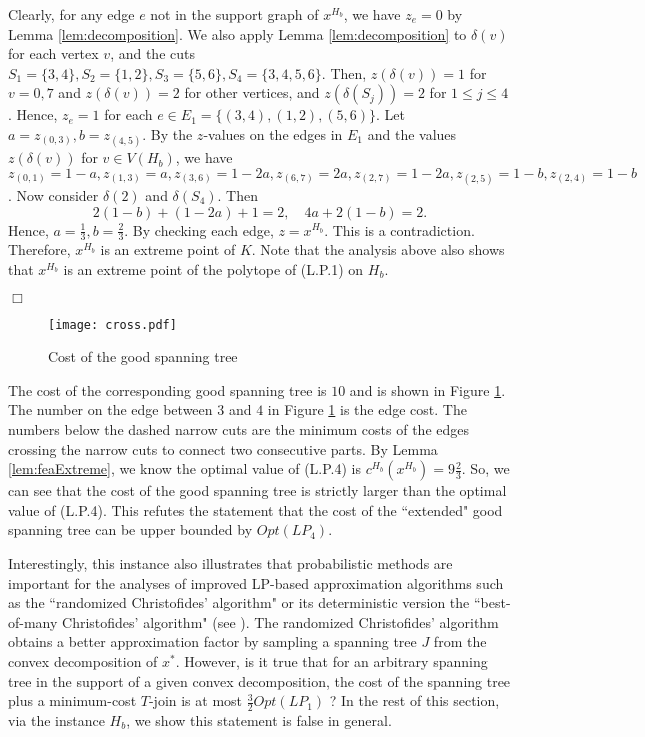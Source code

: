 \documentclass[11pt]{article}
\newcommand{\qed}{\hspace*{\fill}$\Box$}
\newenvironment{proof}[1][Proof. ]{\noindent {\bf #1 }}{\qed}
\begin{document}
\begin{proof}
Clearly, for any edge $e$ not in the support graph of $x^{H_b}$, we have $z_e=0$ by Lemma \ref{lem:decomposition}.
We also
apply Lemma \ref{lem:decomposition} to $\delta(v)$ for each vertex $v$, and the cuts $S_1=\{3, 4\}, S_2=\{1, 2\}, S_3=\{5, 6\}, S_4=\{3, 4, 5, 6\}$.
Then, $z(\delta(v))=1$ for $v=0,7$ and $z(\delta(v))=2$ for other vertices, and $z(\delta(S_j))=2$ for $1\leq j \leq  4$.
Hence, $z_e=1$ for each $e\in E_1=\{(3, 4), (1, 2), (5, 6)\}$. Let $a=z_{(0, 3)}, b=z_{(4, 5)}$. By the $z$-values on the edges in $E_1$ and the values $z(\delta(v))$ for $v\in V(H_b)$, we have $z_{(0, 1)}=1-a, z_{(1, 3)}=a,  z_{(3, 6)}=1-2a, z_{(6, 7)}=2a, z_{(2,7)}=1-2a, z_{(2, 5)}=1-b, z_{(2, 4)}=1-b$.
Now consider $\delta(2)$ and $\delta(S_4)$. Then
\[ 2(1-b)+(1-2a)+1 =2, \quad 4a+2(1-b)=2.\]
Hence, $a=\frac{1}{3}, b=\frac{2}{3}$. By checking each edge, $z=x^{H_b}$. This is a contradiction. Therefore, $x^{H_b}$ is an extreme point of $K$. Note that
the analysis above also shows that $x^{H_b}$ is an extreme point of the polytope of (L.P.1) on $H_b$.

\end{proof}


\begin{figure}[h]
\begin{center}
\texttt{[image: cross.pdf]}\\
  \caption{Cost of the good spanning tree}
  \label{COGST}
\end{center}
\end{figure}

The cost of the corresponding good spanning tree is $10$ and is shown in Figure \ref{COGST}.
The number on the edge between $3$ and $4$ in Figure \ref{COGST} is the edge cost.
The numbers below the dashed narrow cuts are the minimum costs of the edges crossing the
 narrow cuts to connect two consecutive parts. By Lemma \ref{lem:feaExtreme}, we know the optimal value of (L.P.4) is $c^{H_b}(x^{H_b})=9\frac{2}{3}$.
 So, we can see that the cost of the good spanning tree
 is strictly larger than the optimal value of (L.P.4). This refutes the statement that the cost of the ``extended"
good spanning tree can be upper bounded by $Opt(LP_4)$.

Interestingly, this instance also illustrates that probabilistic methods are
important for the analyses of improved LP-based approximation
algorithms such as the  ``randomized Christofides' algorithm" or its
deterministic version the ``best-of-many Christofides' algorithm"
(see \cite{AKS12}). The randomized Christofides' algorithm obtains a better approximation factor
by sampling a spanning tree $J$ from the convex decomposition of $x^*$.  However, is it true that for an arbitrary spanning tree in the support of a given convex decomposition,
the cost of the spanning tree plus a minimum-cost  $T$-join is at most $\frac{3}{2}Opt(LP_1)$ ?
In the rest of this section, via the instance $H_{b}$, we show this statement is false in general.
\end{document}
